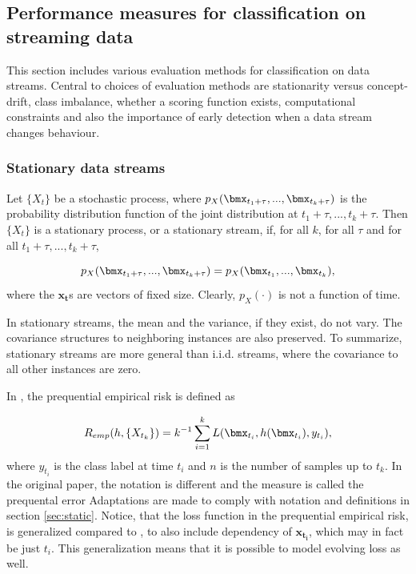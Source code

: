 


\subsection{Performance measures for classification on streaming data}
\label{sec:stream}

This section includes various evaluation methods for classification on data streams.  Central to choices of evaluation methods are stationarity versus concept-drift, class imbalance, whether a scoring function exists, computational constraints and also the importance of early detection when a data stream changes behaviour.

\subsubsection{Stationary data streams}

Let $\{X_{t}\}$ be a stochastic process, where $p_X(\bmx_{t_1 + \tau},...,\bmx_{t_k + \tau} )$ is the probability distribution function of the joint distribution at $t_1 + \tau,...,t_k + \tau$.  Then $\{X_t\}$ is a stationary process, or a stationary stream, if, for all $k$, for all $\tau$ and for all $t_1 + \tau,...,t_k + \tau$, 

\begin{equation}
\label{eq:stationarity}
p_X(\bmx_{t_1 + \tau},...,\bmx_{t_k + \tau} ) = p_X(\bmx_{t_1},...,\bmx_{t_k} ),
\end{equation}
where the $\bm{x_t}$s are vectors of fixed size.  Clearly, $p_X(\cdot)$ is not a function of time.  

In stationary streams, the mean and the variance, if they exist, do not vary.  The covariance structures to neighboring instances are also preserved.  To summarize, stationary streams are more general than i.i.d. streams, where the covariance to all other instances are zero.  

In \cite{Gam13}, the prequential empirical risk is defined as 

\begin{equation}
\label{eq:prequentialRisk}
R_{emp}(h, \{X_{t_k}\}) = k^{-1} \sum_{i=1}^k L(\bmx_{t_i} , h(\bmx_{t_i} ), y_{t_i}),
\end{equation}
where $y_{t_i}$ is the class label at time $t_i$ and $n$ is the number of samples up to $t_k$.  In the original paper, the notation is different and the measure is called the prequental error  Adaptations are made to comply with notation and definitions in section \ref{sec:static}.  Notice, that the loss function in the prequential empirical risk, is generalized compared to \cite{Gam13}, to also include dependency of $\bm{x_{t_i}}$, which may in fact be just $t_i$.  This generalization means that it is possible to model evolving loss as well.

